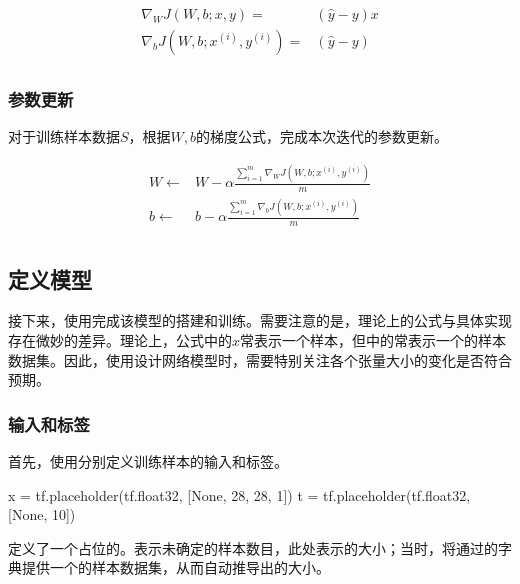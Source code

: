 \begin{content}
\begin{content}
\[\begin{aligned}
  {\nabla _W}J\left( {W,b;x,y} \right) =  & \left( {\widehat y - y} \right)x \\ 
  {\nabla _b}J\left( {W,b;{x^{(i)}},{y^{(i)}}} \right) =  & \left( {\widehat y - y} \right) \\ 
\end{aligned} \]


\subsubsection{参数更新}

对于训练样本数据$ S $，根据$W, b$的梯度公式，完成本次迭代的参数更新。

\[\begin{aligned}
  W \leftarrow  & W - \alpha \frac{{\sum\limits_{i = 1}^m {{\nabla _W}J\left( {W,b;{x^{(i)}},{y^{(i)}}} \right)} }}{m} \\ 
  b \leftarrow  & b - \alpha \frac{{\sum\limits_{i = 1}^m {{\nabla _b}J\left( {W,b;{x^{(i)}},{y^{(i)}}} \right)} }}{m} \\ 
\end{aligned} \]

\subsection{定义模型}

接下来，使用\tf{}完成该模型的搭建和训练。需要注意的是，理论上的公式与\tf{}具体实现存在微妙的差异。理论上，公式中的$x$常表示一个样本，但\tf{}中的常表示一个的样本数据集。因此，使用\tf{}设计网络模型时，需要特别关注各个张量大小的变化是否符合预期。

\subsubsection{输入和标签}

首先，使用分别定义训练样本的输入和标签。

\begin{leftbar}
\begin{python}
x = tf.placeholder(tf.float32, [None, 28, 28, 1])
t = tf.placeholder(tf.float32, [None, 10])
\end{python}
\end{leftbar}

定义了一个占位的。表示未确定的样本数目，此处表示的大小；当时，将通过的字典提供一个的样本数据集，从而自动推导出的大小。


\end{content}
\end{content}
